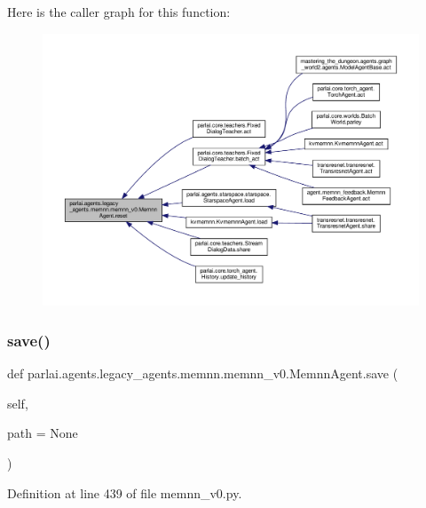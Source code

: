 Here is the caller graph for this function\+:
\nopagebreak
\begin{figure}[H]
\begin{center}
\leavevmode
\includegraphics[width=350pt]{classparlai_1_1agents_1_1legacy__agents_1_1memnn_1_1memnn__v0_1_1MemnnAgent_ad365b2e33983158fbf7581d361a74246_icgraph}
\end{center}
\end{figure}
\mbox{\label{classparlai_1_1agents_1_1legacy__agents_1_1memnn_1_1memnn__v0_1_1MemnnAgent_a20509f6931e68ff52e965d3e214c7b0a}} 
\subsubsection{\texorpdfstring{save()}{save()}}
{\footnotesize\ttfamily def parlai.\+agents.\+legacy\+\_\+agents.\+memnn.\+memnn\+\_\+v0.\+Memnn\+Agent.\+save (\begin{DoxyParamCaption}\item[{}]{self,  }\item[{}]{path = {\ttfamily None} }\end{DoxyParamCaption})}



Definition at line 439 of file memnn\+\_\+v0.\+py.



